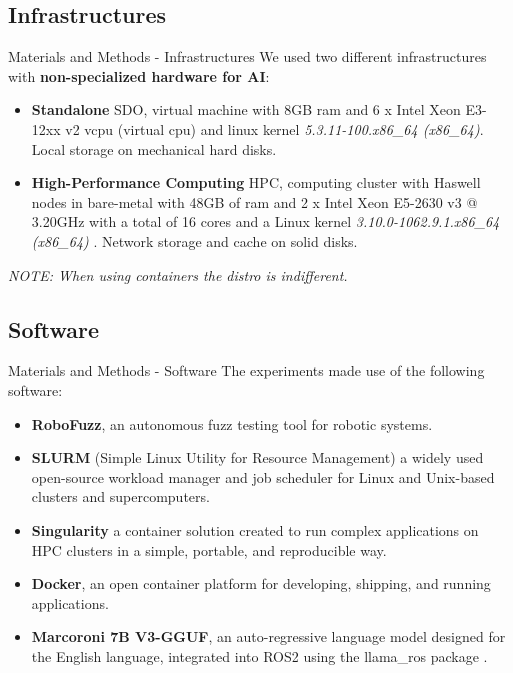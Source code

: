 \documentclass[aspectratio=169]{beamer}
\begin{document}
 \subsection{Infrastructures}
\begin{frame}{Materials and Methods - Infrastructures}
We used two different infrastructures with \textbf{non-specialized hardware for AI}:
\begin{itemize}
    \item \textbf{Standalone} SDO,  virtual machine with 8GB ram and 6 x Intel Xeon E3-12xx v2 vcpu (virtual cpu) and linux kernel \textit{5.3.11-100.x86\_64 (x86\_64)}. Local storage on mechanical hard disks.
  
    \item \textbf{High-Performance Computing} HPC, computing cluster with Haswell nodes in bare-metal with 48GB of ram and 2 x Intel Xeon E5-2630 v3 @ 3.20GHz with a total of 16 cores and a Linux kernel \textit{3.10.0-1062.9.1.x86\_64 (x86\_64) } .
      Network storage and cache on solid disks. %
      
\end{itemize}
\textit{NOTE: When using containers the distro is indifferent.}
\end{frame}
 
\subsection{Software}
\begin{frame}{Materials and Methods - Software}
The experiments made use of the following software:

\begin{itemize}
    \item \textbf{RoboFuzz}, an autonomous fuzz testing tool for robotic systems. 
    \item \textbf{SLURM} (Simple Linux Utility for Resource Management) a widely used open-source workload manager and job scheduler for Linux and Unix-based clusters and supercomputers.
    \item \textbf{Singularity} a container solution created to run complex applications on HPC clusters in a simple, portable, and reproducible way.
    \item \textbf{Docker}, an open container platform for developing, shipping, and running applications.
    \item \textbf{Marcoroni 7B V3-GGUF}, an auto-regressive language model designed for the English language, integrated into ROS2 using the llama\_ros package  .    
\end{itemize}

\end{frame}
\end{document}
